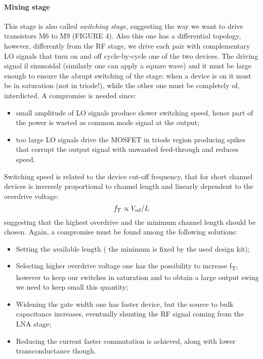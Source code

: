 \paragraph{Mixing stage}
This stage is also called \emph{switching stage}, suggesting the way we want to drive transistors M6 to M9 (FIGURE 4). Also this one has a differential topology, however, differently from the RF stage, we drive each pair with complementary LO signals that turn on and off cycle-by-cycle one of the two devices. The driving signal il sinusoidal (similarly one can apply a square wave) and it must be large enough to ensure the abrupt switching of the stage: when a device is on it must be in saturation (not in  triode!), while the other one must be completely of, interdicted.
A compromise is needed since:
\begin{itemize}
	\item small amplitude of LO signals produce slower switching speed, hence part of the power is wasted as common mode signal at the output;
	\item too large LO signals drive the MOSFET in triode region producing spikes that corrupt the output signal with unwanted feed-through  and reduces speed.
\end{itemize}
Switching speed is related to the device cut-off frequency, that for short channel devices is inversely proportional to channel length and linearly dependent to the overdrive voltage:
\begin{equation}
f_T \propto  V_{od}/L \notag
\end{equation}
suggesting that the highest overdrive and the minimum channel length should be chosen. Again, a compromise must be found among the following solutions:
\begin{itemize}
	\item Setting the available length ( the minimum is fixed by the used design kit);
	\item Selecting higher overdrive voltage one has the possibility to increase f\textsubscript{T}, however to keep our switches in saturation and to obtain a large output swing we need to keep small this quantity;
	\item Widening the gate width one has faster device, but the source to bulk capacitance increases, eventually shunting the RF signal coming from the LNA stage;
	\item Reducing the current faster commutation is achieved, along with lower transconductance though.
\end{itemize}

